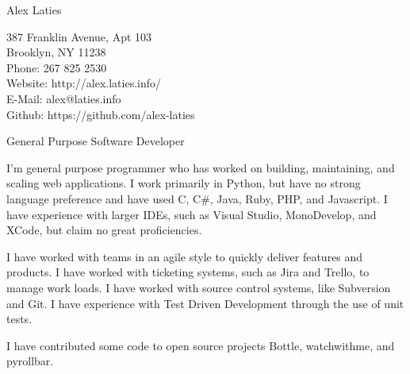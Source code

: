\documentclass[a4paper]{article}
\begin{document}
    \begin{center}
        \begin{LARGE}
            Alex Laties \\
        \end{LARGE}
        387 Franklin Avenue, Apt 103\\
        Brooklyn, NY 11238\\
        Phone: 267 825 2530\\
        Website: http://alex.laties.info/ \\
        E-Mail: alex@laties.info \\
        Github: https://github.com/alex-laties \\
    \end{center}

    \vspace{.1in}
    \begin{center}
    \begin{Large}
        General Purpose Software Developer
    \end{Large}
    \end{center}

    \vspace{.1in}
    I'm general purpose programmer who has worked on building, maintaining, and scaling web applications. I work primarily in Python, but have no strong language preference and have used C, C\#, Java, Ruby, PHP, and Javascript.  I have experience with larger IDEs, such as Visual Studio, MonoDevelop, and XCode, but claim no great proficiencies. \\
    \par
    \indent I have worked with teams in an agile style to quickly deliver features and products. I have worked with ticketing systems, such as Jira and Trello, to manage work loads. I have worked with source control systems, like Subversion and Git. I have experience with Test Driven Development through the use of unit tests. \\
    \par
    \indent I have contributed some code to open source projects Bottle, watchwithme, and pyrollbar.\\
\end{document}
